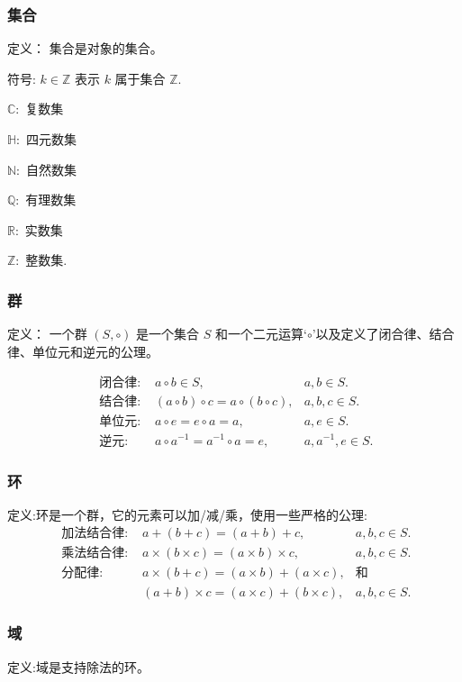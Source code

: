 \subsubsection*{集合}
定义： 集合是对象的集合。

符号: $k \in \mathbb{Z}$ 表示 $k$ 属于集合 $\mathbb{Z}$.


$\mathbb{C}:$  复数集

$\mathbb{H}:$  四元数集

$\mathbb{N}:$  自然数集

$\mathbb{Q}:$  有理数集 

$\mathbb{R}:$  实数集

$\mathbb{Z}:$  整数集.

\subsubsection*{群}
定义： 一个群 $(S, \circ)$ 是一个集合 $S$ 和一个二元运算‘$\circ$’以及定义了闭合律、结合律、单位元和逆元的公理。

$$
    \begin{array}{rlr}
        \text { 闭合律: }       & a \circ b \in S,                        & a, b \in S .         \\
        \text { 结合律: } & (a \circ b) \circ c=a \circ(b \circ c), & a, b, c \in S .      \\
        \text { 单位元: }      & a \circ e=e \circ a=a,                  & a, e \in S .         \\
        \text { 逆元: }       & a \circ a^{-1}=a^{-1} \circ a=e,        & a, a^{-1}, e \in S .
    \end{array}
$$

\subsubsection*{环}
定义:环是一个群，它的元素可以加/减/乘，使用一些严格的公理:
$$
    \begin{array}{rlr}
        \text { 加法结合律: } &a+(b+c)=(a+b)+c, & a, b, c \in S.\\
        \text { 乘法结合律: } &a \times(b \times c)=(a \times b) \times c, & a, b, c \in S.\\
        \text { 分配律: } &a \times(b+c)=(a \times b)+(a \times c), & \text{和}\\
        &(a+b) \times c=(a \times c)+(b \times c), & a, b, c \in S .
\end{array}
$$
\subsubsection*{域}
定义:域是支持除法的环。

